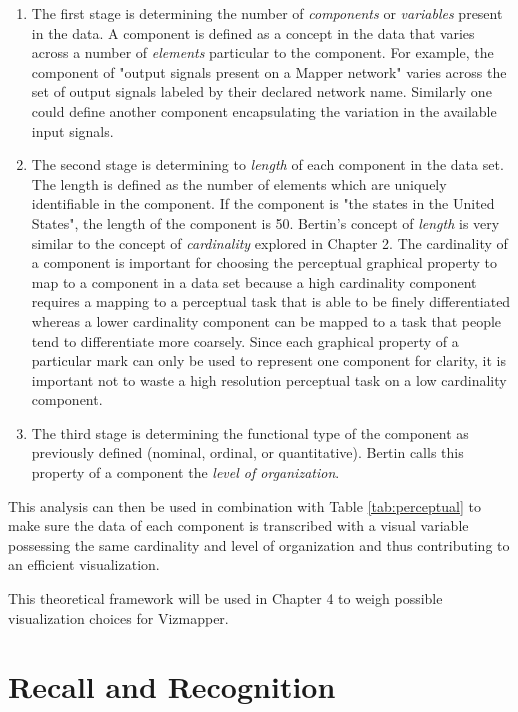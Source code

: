 \begin{enumerate}
\item The first stage is determining the number of \emph{components} or \emph{variables} present in the data. A component is defined as a concept in the data that varies across a number of \emph{elements} particular to the component. For example, the component of "output signals present on a Mapper network" varies across the set of output signals labeled by their declared network name. Similarly one could define another component encapsulating the variation in the available input signals. 

\item The second stage is determining to \emph{length} of each component in the data set. The length is defined as the number of elements which are uniquely identifiable in the component. If the component is "the states in the United States", the length of the component is 50. Bertin's concept of \emph{length} is very similar to the concept of \emph{cardinality} explored in Chapter 2. The cardinality of a component is important for choosing the perceptual graphical property to map to a component in a data set because a high cardinality component requires a mapping to a perceptual task that is able to be finely differentiated whereas a lower cardinality component can be mapped to a task that people tend to differentiate more coarsely. Since each graphical property of a particular mark can only be used to represent one component for clarity, it is important not to waste a high resolution perceptual task on a low cardinality component.

\item The third stage is determining the functional type of the component as previously defined (nominal, ordinal, or quantitative). Bertin calls this property of a component the \emph{level of organization}.
\end{enumerate}

This analysis can then be used in combination with Table \ref{tab:perceptual} to make sure the data of each component is transcribed with a visual variable possessing the same cardinality and level of organization and thus contributing to an efficient visualization.

This theoretical framework will be used in Chapter 4 to weigh possible visualization choices for Vizmapper.

\section{Recall and Recognition}

